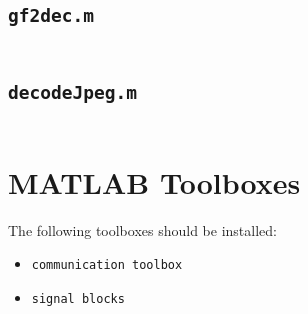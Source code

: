 \documentclass[12pt,a4paper]{article}
\begin{document}
\subsection{\texttt{gf2dec.m}}
\inputminted[linenos,tabsize=2,breaklines, fontsize=\footnotesize]{matlab}{../code/gf2dec.m}
\subsection{\texttt{decodeJpeg.m}}
\inputminted[linenos,tabsize=2,breaklines, fontsize=\footnotesize]{matlab}{../code/decodeJpeg.m}

\section{MATLAB Toolboxes}\label{ap:sec:toolboxes}
The following toolboxes should be installed:
\begin{itemize}
  \item \texttt{communication toolbox}
  \item \texttt{signal blocks}
\end{itemize}




\end{document}

